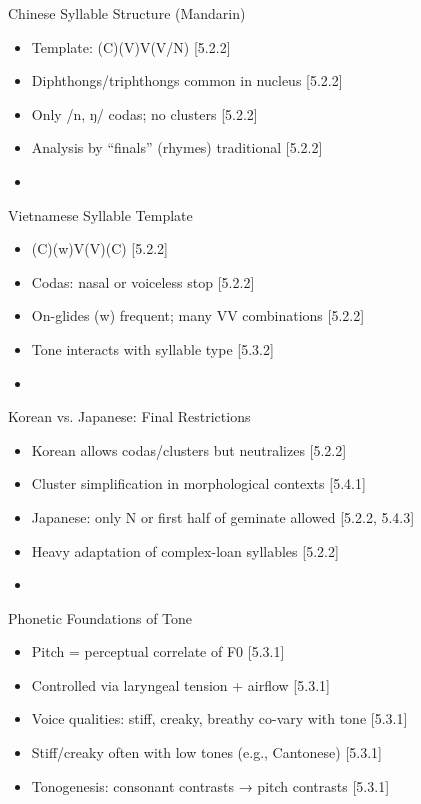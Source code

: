 \documentclass{beamer}
\newcommand{\booksrc}[1]{\hfill {\tiny [#1]}}
\begin{document}
\begin{frame}{Chinese Syllable Structure (Mandarin)}
\begin{itemize}
\item Template: (C)(V)V(V/N) \booksrc{5.2.2}
\item Diphthongs/triphthongs common in nucleus \booksrc{5.2.2}
\item Only /n, ŋ/ codas; no clusters \booksrc{5.2.2}
\item Analysis by “finals” (rhymes) traditional \booksrc{5.2.2}
\item %
\end{itemize}
\end{frame}

\begin{frame}{Vietnamese Syllable Template}
\begin{itemize}
\item (C)(w)V(V)(C) \booksrc{5.2.2}
\item Codas: nasal or voiceless stop \booksrc{5.2.2}
\item On-glides (w) frequent; many VV combinations \booksrc{5.2.2}
\item Tone interacts with syllable type \booksrc{5.3.2}
\item %
\end{itemize}
\end{frame}

\begin{frame}{Korean vs. Japanese: Final Restrictions}
\begin{itemize}
\item Korean allows codas/clusters but neutralizes \booksrc{5.2.2}
\item Cluster simplification in morphological contexts \booksrc{5.4.1}
\item Japanese: only N or first half of geminate allowed \booksrc{5.2.2, 5.4.3}
\item Heavy adaptation of complex-loan syllables \booksrc{5.2.2}
\item %
\end{itemize}
\end{frame}


\begin{frame}{Phonetic Foundations of Tone}
\begin{itemize}
\item Pitch = perceptual correlate of F0 \booksrc{5.3.1}
\item Controlled via laryngeal tension + airflow \booksrc{5.3.1}
\item Voice qualities: stiff, creaky, breathy co-vary with tone \booksrc{5.3.1}
\item Stiff/creaky often with low tones (e.g., Cantonese) \booksrc{5.3.1}
\item Tonogenesis: consonant contrasts → pitch contrasts \booksrc{5.3.1}
\end{itemize}
\end{frame}
\end{document}
